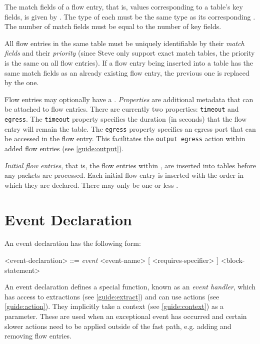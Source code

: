 The match fields of a flow entry, that is, values corresponding to a table's key fields, is given by . The type of each  must be the same type as its corresponding . The number of match fields must be equal to the number of key fields.

All flow entries in the same table must be uniquely identifiable by their \textit{match fields} and their \textit{priority} (since Steve only support exact match tables, the priority is the same on all flow entries). If a flow entry being inserted into a table has the same match fields as an already existing flow entry, the previous one is replaced by the one.

Flow entries may optionally have a . \textit{Properties} are additional metadata that can be attached to flow entries. There are currently two properties: \texttt{timeout} and \texttt{egress}. The \texttt{timeout} property specifies the duration (in seconds) that the flow entry will remain the table. The \texttt{egress} property specifies an egress port that can be accessed in the flow entry. This facilitates the \texttt{output egress} action within added flow entries (see \ref{guide:output}).

\textit{Initial flow entries}, that is, the flow entries within , are inserted into tables before any packets are processed. Each initial flow entry is inserted with the order in which they are declared. There may only be one or less .

\section{Event Declaration} \label{guide:event}

An event declaration has the following form:

\begin{minip}
\begin{grammar}
<event-declaration> ::=
\textit{event} <event-name> [ <requires-specifier> ]
<block-statement>
\end{grammar}
\end{minip}

An event declaration defines a special function, known as an \textit{event handler}, which has access to extractions (see \ref{guide:extract}) and can use actions (see \ref{guide:action}). They implicitly take a context (see \ref{guide:context}) as a parameter. These are used when an exceptional event has occurred and certain slower actions need to be applied outside of the fast path, e.g. adding and removing flow entries.

